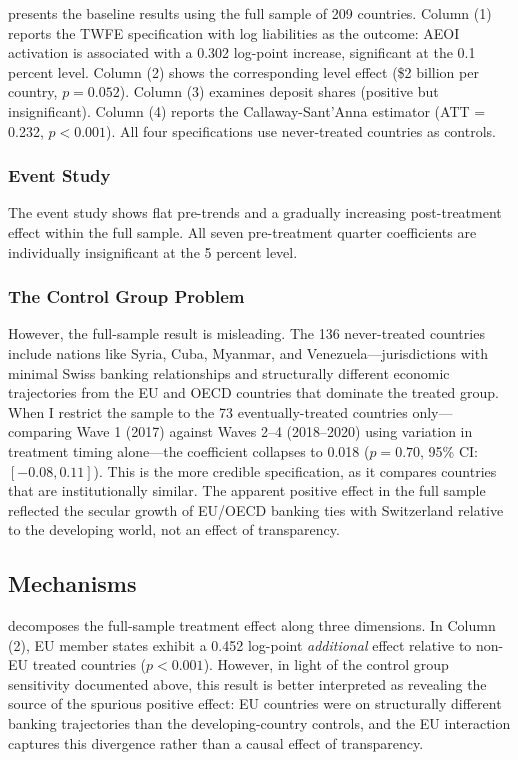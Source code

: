 \documentclass[12pt]{article}
\begin{document}


 presents the baseline results using the full sample of 209 countries. Column (1) reports the TWFE specification with log liabilities as the outcome: AEOI activation is associated with a 0.302 log-point increase, significant at the 0.1 percent level. Column (2) shows the corresponding level effect (\$2 billion per country, $p = 0.052$). Column (3) examines deposit shares (positive but insignificant). Column (4) reports the Callaway-Sant'Anna estimator (ATT = 0.232, $p < 0.001$). All four specifications use never-treated countries as controls.

\subsubsection*{Event Study} The event study shows flat pre-trends and a gradually increasing post-treatment effect within the full sample. All seven pre-treatment quarter coefficients are individually insignificant at the 5 percent level.

\subsubsection*{The Control Group Problem} However, the full-sample result is misleading. The 136 never-treated countries include nations like Syria, Cuba, Myanmar, and Venezuela---jurisdictions with minimal Swiss banking relationships and structurally different economic trajectories from the EU and OECD countries that dominate the treated group. When I restrict the sample to the 73 eventually-treated countries only---comparing Wave 1 (2017) against Waves 2--4 (2018--2020) using variation in treatment timing alone---the coefficient collapses to 0.018 ($p = 0.70$, 95\% CI: $[-0.08, 0.11]$). This is the more credible specification, as it compares countries that are institutionally similar. The apparent positive effect in the full sample reflected the secular growth of EU/OECD banking ties with Switzerland relative to the developing world, not an effect of transparency.

\subsection{Mechanisms}



 decomposes the full-sample treatment effect along three dimensions. In Column (2), EU member states exhibit a 0.452 log-point \textit{additional} effect relative to non-EU treated countries ($p < 0.001$). However, in light of the control group sensitivity documented above, this result is better interpreted as revealing the source of the spurious positive effect: EU countries were on structurally different banking trajectories than the developing-country controls, and the EU interaction captures this divergence rather than a causal effect of transparency.
\end{document}
